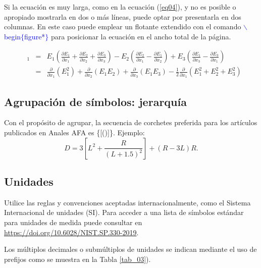 \documentclass{analesafa}
\begin{document}
Si la ecuación es muy larga, como en la ecuación (\ref{eq04}), y no es posible o apropiado mostrarla en dos o más líneas, puede optar por presentarla en dos columnas. En este caso puede emplear un flotante extendido con el comando \textcolor{Blue}{\textsf{$\backslash$begin$\{$figure*$\}$}}
para posicionar la ecuación en el ancho total de la página.

\begin{figure}
\begin{eqnarray}
[\mathbf{E}(\mathbf{\nabla . E}) - \mathbf{E}\times (\mathbf{\nabla \times E})]_{1}  & = & 
E_{1}\left( \frac{\partial E_{1}}{\partial x_{1}} +  \frac{\partial E_{2}}{\partial x_{2}} + \frac{\partial E_{3}}{\partial x_{3}} \right) 
- E_{2}\left( \frac{\partial E_{2}}{\partial x_{1}} -  \frac{\partial E_{1}}{\partial x_{2}} \right)
+ E_{3}\left( \frac{\partial E_{1}}{\partial x_{3}} -  \frac{\partial E_{3}}{\partial x_{1}} \right)
\nonumber\\
 & = & \frac{\partial}{\partial x_{1}}(E_{1}^{2}) + \frac{\partial}{\partial x_{2}}(E_{1}E_{2}) + \frac{\partial}{\partial x_{3}}(E_{1}E_{3}) - \frac{1}{2}\frac{\partial}{\partial x_{1}}(E_{1}^{2}+E_{2}^{2}+E_{3}^{2})
\label{eq04}
\end{eqnarray}
\end{figure}

\subsection{Agrupación de símbolos: jerarquía}

Con el propósito de agrupar, la secuencia de corchetes preferida para los artículos publicados en Anales AFA es \large{\{[()]\}}. \normalsize Ejemplo:
\begin{equation}
D=3\left[L^{2}+\frac{R}{(L+1.5)^{2}}\right]+(R-3L)R. 
\label{eq05}
\end{equation}

\subsection{Unidades}

Utilice las reglas y convenciones aceptadas internacionalmente, como el Sistema Internacional de unidades (SI). Para acceder a una lista de símbolos estándar para unidades de medida  puede  consultar en \url{https://doi.org/10.6028/NIST.SP.330-2019}.

Los múltiplos decimales o submúltiplos de unidades se indican mediante el uso de prefijos como se muestra en la Tabla \ref{tab_03}).
\end{document}

